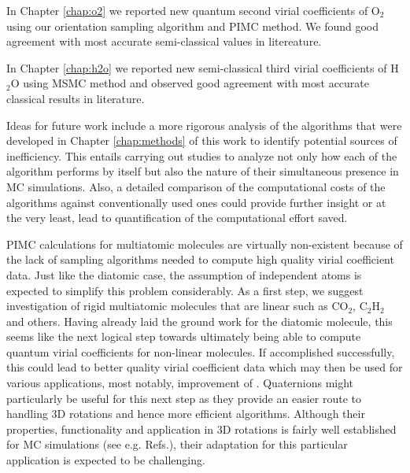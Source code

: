     In Chapter \ref{chap:o2} we reported new quantum second virial coefficients of O$_2$ using our orientation sampling algorithm and PIMC method. We found good agreement with most accurate semi-classical values in litereature.

    In Chapter \ref{chap:h2o} we reported new semi-classical third virial coefficients of H$_2$O using MSMC method and observed good agreement with most accurate classical results in literature.

    Ideas for future work include a more rigorous analysis of the algorithms that were developed in Chapter \ref{chap:methods} of this work to identify potential sources of inefficiency. This entails carrying out studies to analyze not only how each of the algorithm performs by itself but also the nature of their simultaneous presence in MC simulations. Also, a detailed comparison of the computational costs of the algorithms against conventionally used ones could provide further insight or at the very least, lead to quantification of the computational effort saved.
    
    PIMC calculations for multiatomic molecules are virtually non-existent because of the lack of sampling algorithms needed to compute high quality virial coefficient data. Just like the diatomic case, the assumption of independent atoms is expected to simplify this problem considerably. As a first step, we suggest investigation of rigid multiatomic molecules that are linear such as CO$_2$, C$_2$H$_2$ and others. Having already laid the ground work for the diatomic molecule, this seems like the next logical step towards ultimately being able to compute quantum virial coefficients for non-linear molecules. If accomplished successfully, this could lead to better quality virial coefficient data which may then be used for various applications, most notably, improvement of \abinitio{} \PESs{}. Quaternions might particularly be useful for this next step as they provide an easier route to handling 3D rotations and hence more efficient algorithms. Although their properties, functionality and application in 3D rotations is fairly well established for MC simulations (see e.g. Refs.\cite{Karney2007,Sinkovits2012}), their adaptation for this particular application is expected to be challenging.
